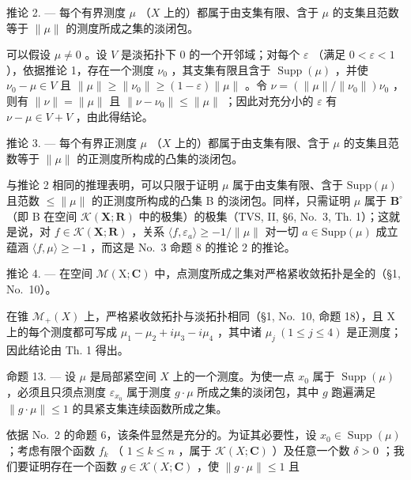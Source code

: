 推论 2. --- 每个有界测度 \(\mu\) （\(X\) 上的）都属于由支集有限、含于 \(\mu\) 的支集且范数等于 \(\|\mu\|\) 的测度所成之集的淡闭包。

可以假设 \(\mu \neq 0\) 。设 \(V\) 是淡拓扑下 0 的一个开邻域；对每个 \(\varepsilon\) （满足 \(0 < \varepsilon < 1\) ），依据推论 1，存在一个测度 \(\nu_0\) ，其支集有限且含于 \(\operatorname{Supp}(\mu)\) ，并使 \(\nu_0 - \mu \in V\) 且 \(\| \mu \| \geqslant \| \nu_0 \| \geqslant (1 - \varepsilon) \| \mu \|\) 。令 \(\nu = (\| \mu \| / \| \nu_0 \|) \nu_0\) ，则有 \(\| \nu \| = \| \mu \|\) 且 \(\| \nu - \nu_0 \| \leqslant \| \mu \|\) ；因此对充分小的 \(\varepsilon\) 有 \(\nu - \mu \in V + V\) ，由此得结论。

推论 3. --- 每个有界正测度 \(\mu\) （\(X\) 上的）都属于由支集有限、含于 \(\mu\) 的支集且范数等于 \(\|\mu\|\) 的正测度所构成的凸集的淡闭包。

与推论 2 相同的推理表明，可以只限于证明 \(\mu\) 属于由支集有限、含于 \(\mathrm{Supp}(\mu)\) 且范数 \(\leqslant \| \mu \|\) 的正测度所构成的凸集 B 的淡闭包。同样，只需证明 \(\mu\) 属于 \(\mathbf{B}^{\circ}\) （即 B 在空间 \(\mathcal{K}(\mathbf{X};\mathbf{R})\) 中的极集）的极集（TVS, II, §6, No.~3, Th. 1）；这就是说，对 \(f\in \mathcal{K}(\mathbf{X};\mathbf{R})\) ，关系 \(\langle f,\varepsilon_a\rangle \geqslant -1 / \| \mu \|\) 对一切 \(a\in \mathrm{Supp}(\mu)\) 成立蕴涵 \(\langle f,\mu \rangle \geqslant -1\) ，而这是 No.~3 命题 8 的推论 2 的推论。

推论 4. --- 在空间 \(\mathcal{M}(\mathrm{X};\mathbf{C})\) 中，点测度所成之集对严格紧收敛拓扑是全的（§1, No.~10）。

在锥 \(\mathcal{M}_{+}(X)\) 上，严格紧收敛拓扑与淡拓扑相同（§1, No.~10, 命题 18），且 X 上的每个测度都可写成 \(\mu_{1}-\mu_{2}+i\mu_{3}-i\mu_{4}\) ，其中诸 \(\mu_{j}\ (1\leqslant j\leqslant4)\) 是正测度；因此结论由 Th. 1 得出。

命题 13. --- 设 \(\mu\) 是局部紧空间 \(X\) 上的一个测度。为使一点 \(x_0\) 属于 \(\operatorname{Supp}(\mu)\) ，必须且只须点测度 \(\varepsilon_{x_0}\) 属于测度 \(g \cdot \mu\) 所成之集的淡闭包，其中 \(g\) 跑遍满足 \(\| g \cdot \mu \| \leqslant 1\) 的具紧支集连续函数所成之集。

依据 No.~2 的命题 6，该条件显然是充分的。为证其必要性，设 \(x_0 \in \operatorname{Supp}(\mu)\) ；考虑有限个函数 \(f_k\) （ \(1 \leqslant k \leqslant n\) ，属于 \(\mathcal{K}(X; \mathbf{C})\) ）及任意一个数 \(\delta > 0\) ；我们要证明存在一个函数 \(g \in \mathcal{K}(X; \mathbf{C})\) ，使 \(\| g \cdot \mu \| \leqslant 1\) 且

